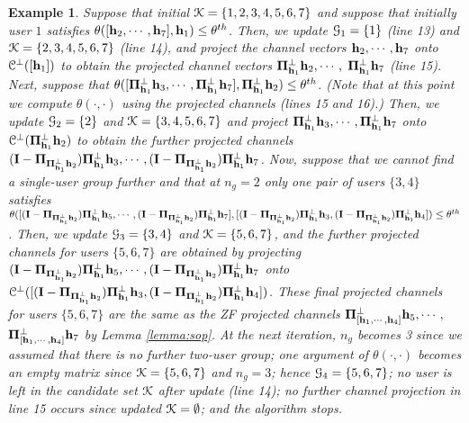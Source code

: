 \documentclass[11pt, draft, onecolumn ]{IEEEtran}
\newtheorem{example}{Example}
\begin{document}
\begin{example}
Suppose that initial ${\cal K}=\{1,2,3,4,5,6,7\}$ and  suppose that initially user $1$ satisfies $\theta([{\bf h}_2,\cdots,{\bf h}_7],{\bf h}_1) \leq \theta^{th}$. Then, we update ${\cal G}_1 = \{1\}$ (line 13) and   ${\cal K}=\{2,3,4,5,6,7\}$ (line 14), and project the channel vectors ${\bf h}_2,\cdots,{\bf h}_7$ onto ${\cal C}^\perp([{\bf h}_1])$ to obtain the projected channel vectors ${\bf \Pi}_{{\bf h}_1}^\perp {\bf h}_2, \cdots,$ ${\bf \Pi}_{{\bf h}_1}^\perp {\bf h}_7$ (line 15).  Next, suppose that $\theta([{\bf \Pi}_{{\bf h}_1}^\perp {\bf h}_3,\cdots, {\bf \Pi}_{{\bf h}_1}^\perp {\bf h}_7], {\bf \Pi}_{{\bf h}_1}^\perp {\bf h}_2) \le \theta^{th}$. (Note that at this point we compute $\theta(\cdot,\cdot)$ using the {\em projected} channels (lines 15 and 16).)  Then, we update ${\cal G}_2 =\{2\}$ and ${\cal K}=\{3,4,5,6,7\}$ and project ${\bf \Pi}_{{\bf h}_1}^\perp {\bf h}_3, \cdots, {\bf \Pi}_{{\bf h}_1}^\perp {\bf h}_7$ onto ${\cal C}^\perp({\bf \Pi}_{{\bf h}_1}^\perp{\bf h}_2)$ to obtain the further projected channels $({\bf I} - {\bf \Pi}_{{\bf \Pi}_{{\bf h}_1}^\perp {\bf h}_2}){\bf \Pi}_{{\bf h}_1}^\perp {\bf h}_3, \cdots, ({\bf I} - {\bf \Pi}_{{\bf \Pi}_{{\bf h}_1}^\perp {\bf h}_2}){\bf \Pi}_{{\bf h}_1}^\perp {\bf h}_7$.  Now, suppose that we cannot find a single-user group further and that at $n_g=2$ only one pair of users $\{3,4\}$ satisfies $\theta ( [({\bf I} - {\bf \Pi}_{{\bf \Pi}_{{\bf h}_1}^\perp {\bf h}_2}){\bf \Pi}_{{\bf h}_1}^\perp {\bf h}_5, \cdots, ({\bf I} - {\bf \Pi}_{{\bf \Pi}_{{\bf h}_1}^\perp {\bf h}_2}){\bf \Pi}_{{\bf h}_1}^\perp {\bf h}_7] ,[({\bf I} - {\bf \Pi}_{{\bf \Pi}_{{\bf h}_1}^\perp {\bf h}_2}){\bf \Pi}_{{\bf h}_1}^\perp {\bf h}_3,  ({\bf I} - {\bf \Pi}_{{\bf \Pi}_{{\bf h}_1}^\perp {\bf h}_2}){\bf \Pi}_{{\bf h}_1}^\perp {\bf h}_4]  ) \le \theta^{th}$. Then, we update ${\cal G}_3=\{3,4\}$ and  ${\cal K}=\{5,6,7\}$, and  the further projected channels for users $\{5,6,7\}$ are obtained by projecting $({\bf I} - {\bf \Pi}_{{\bf \Pi}_{{\bf h}_1}^\perp {\bf h}_2}){\bf \Pi}_{{\bf h}_1}^\perp {\bf h}_5, \cdots, ({\bf I} - {\bf \Pi}_{{\bf \Pi}_{{\bf h}_1}^\perp {\bf h}_2}){\bf \Pi}_{{\bf h}_1}^\perp {\bf h}_7$ onto ${\cal C}^\perp([({\bf I} - {\bf \Pi}_{{\bf \Pi}_{{\bf h}_1}^\perp {\bf h}_2}){\bf \Pi}_{{\bf h}_1}^\perp {\bf h}_3,  ({\bf I} - {\bf \Pi}_{{\bf \Pi}_{{\bf h}_1}^\perp {\bf h}_2}){\bf \Pi}_{{\bf h}_1}^\perp {\bf h}_4])$. These final projected channels for users $\{5,6,7\}$ are the same as the ZF projected channels ${\bf \Pi}_{[{\bf h}_1,\cdots,{\bf h}_4]}^\perp {\bf h}_5, \cdots,$ ${\bf \Pi}_{[{\bf h}_1,\cdots,{\bf h}_4]}^\perp {\bf h}_7$ by Lemma  \ref{lemma:sop}. At the next iteration, $n_g$ becomes 3 since we assumed that there is no further two-user group;  one argument of $\theta(\cdot,\cdot)$ becomes an empty matrix since ${\cal K}=\{5,6,7\}$ and $n_g=3$; hence ${\cal G}_4=\{5,6,7\}$;  no user is left in the candidate set ${\cal K}$ after update (line 14); no further channel projection in line 15 occurs since updated ${\cal K}=\emptyset$; and the algorithm stops.






\end{example}
\end{document}
